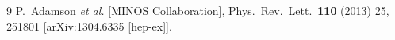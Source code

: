 \begin{thebibliography}{9}
  P.~Adamson {\it et al.}  [MINOS Collaboration],
  Phys.\ Rev.\ Lett.\  {\bf 110} (2013) 25,  251801
  [arXiv:1304.6335 [hep-ex]].

\end{thebibliography}


